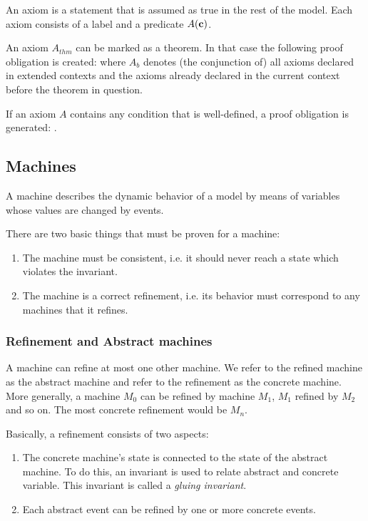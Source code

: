 An axiom is a statement that is assumed as true in the rest of the model.
Each axiom consists of a label and a predicate $A(\mathbf{c})$.

An axiom $A_{thm}$ can be marked as a theorem. In that case the following proof obligation is created:
where $A_b$ denotes (the conjunction of) all axioms declared in extended contexts and the axioms already declared in the current context before the theorem in question.

If an axiom $A$ contains any condition that is well-defined, a proof obligation is generated:
.


\subsection{Machines}
\label{machine}

A machine describes the dynamic behavior of a model by means of variables whose values are changed by events.

There are two basic things that must be proven for a machine:
\begin{enumerate}
	\item The machine must be consistent, i.e. it should never reach a state which violates the invariant.
	\item The machine is a correct refinement, i.e. its behavior must correspond to any machines that it refines.
\end{enumerate}

\subsubsection{Refinement and Abstract machines}
\label{abstract_machine}

A machine can refine at most one other machine. 
We refer to the refined machine as the abstract machine and refer to the refinement as the concrete machine. 
More generally, a machine $M_0$ can be refined by machine $M_1$, $M_1$ refined by $M_2$ 
and so on. The most concrete refinement would be $M_n$. 

Basically, a refinement consists of two aspects:
\begin{enumerate}
	\item The concrete machine's state is connected to the state of the
      abstract machine. To do this, an invariant is used to relate abstract and concrete variable. 
      This invariant is called a \emph{gluing invariant}. 
	\item Each abstract event can be refined by one or more
concrete events.
\end{enumerate}

